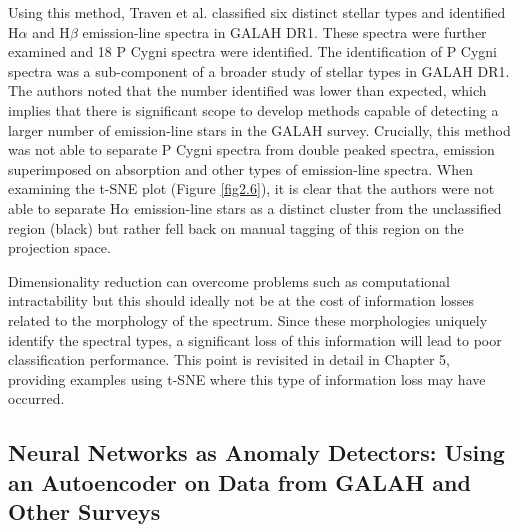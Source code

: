 Using this method, Traven et al. classified six distinct stellar types and identified H$\alpha$ and H$\beta$ emission-line spectra in GALAH DR1. These spectra were further examined and 18 P Cygni spectra were identified. The identification of P Cygni spectra was a sub-component of a broader study of stellar types in GALAH DR1. The authors noted that the number identified was lower than expected, which implies that there is significant scope to develop methods capable of detecting a larger number of emission-line stars in the GALAH survey. Crucially, this method was not able to separate P Cygni spectra from double peaked spectra, emission superimposed on absorption and other types of emission-line spectra. When examining the t-SNE plot (Figure \ref{fig2.6}), it is clear that the authors were not able to separate H$\alpha$ emission-line stars as a distinct cluster from the unclassified region (black) but rather fell back on manual tagging of this region on the projection space. 

Dimensionality reduction can overcome problems such as computational intractability but this should ideally not be at the cost of information losses related to the morphology of the spectrum. Since these morphologies uniquely identify the spectral types, a significant loss of this information will lead to poor classification performance. This point is revisited in detail in Chapter 5, providing examples using t-SNE where this type of information loss may have occurred.

\subsection{Neural Networks as Anomaly Detectors: Using an Autoencoder on Data from GALAH and Other Surveys}

